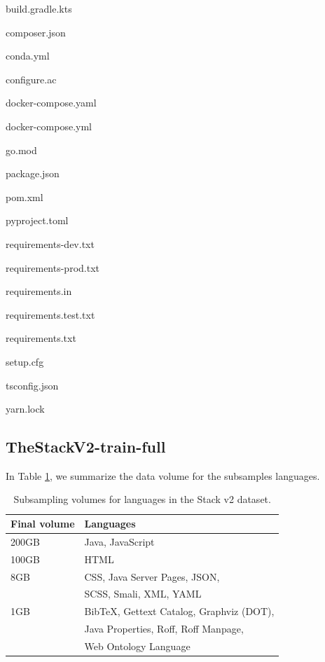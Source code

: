 \documentclass[10pt]{article} %
\begin{document}
\begin{itemize}
\begin{itemize}
        \begin{minipage}[t]{.26\textwidth}
        \item build.gradle.kts
        \item composer.json
        \item conda.yml
        \item configure.ac
        \item docker-compose.yaml
        \item docker-compose.yml
        \item go.mod
        \item package.json
        \item pom.xml
        \end{minipage}
        \begin{minipage}[t]{.26\textwidth}
        \item pyproject.toml
        \item requirements-dev.txt
        \item requirements-prod.txt
        \item requirements.in
        \item requirements.test.txt
        \item requirements.txt
        \item setup.cfg
        \item tsconfig.json
        \item yarn.lock
        \end{minipage}
    \end{itemize} 
\end{itemize}

\subsection{TheStackV2-train-full}\label{app:swh-full}
In Table \ref{tab:lang_subsampling}, we summarize the data volume for the subsamples languages. 

\begin{table}[t]
\caption{Subsampling volumes for languages in the Stack v2 dataset.}
\label{tab:lang_subsampling}
\centering
\begin{tabular}{ll}
\toprule
\textbf{Final volume} & \textbf{Languages} \\
\midrule
200GB & Java, JavaScript \\
100GB & HTML \\
8GB & CSS, Java Server Pages, JSON, \\
     & SCSS, Smali, XML, YAML \\
1GB & BibTeX, Gettext Catalog, Graphviz (DOT), \\
    & Java Properties, Roff, Roff Manpage, \\
    & Web Ontology Language \\
\bottomrule
\end{tabular}
\end{table}
\end{document}
